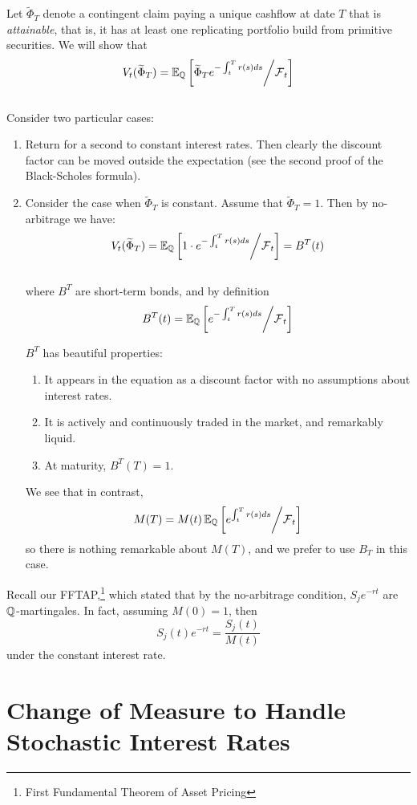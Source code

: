 \documentclass[11pt]{article}
\begin{document}
Let $\widetilde{\Phi}_T$ denote a contingent claim paying a unique cashflow at date $T$ that is {\em attainable}, that is, it has at least one replicating portfolio build from primitive securities. We will show that 
$$ V_t(\widetilde{\Phi}_T) = \operatorname{\mathbb E}_{\operatorname{\mathbb Q}} \left[ \widetilde{\Phi}_T e^{-\int_t^T r(s) ds} \middle/ \operatorname{\mathcal F}_t \right]$$\\

Consider two particular cases:
\begin{enumerate}
\item Return for a second to constant interest rates. Then clearly the discount factor can be moved outside the expectation (see the second proof of the Black-Scholes formula).
\item Consider the case when $\widetilde{\Phi}_T$ is constant. Assume that $\widetilde{\Phi}_T = 1$. Then by no-arbitrage we have:
$$ V_t(\widetilde{\Phi}_T) = \operatorname{\mathbb E}_{\operatorname{\mathbb Q}} \left[ 1 \cdot e^{-\int_t^T r(s) ds} \middle/ \operatorname{\mathcal F}_t \right] = B^T(t)$$\\
where $B^T$ are short-term bonds, and by definition
$$B^T(t) = \operatorname{\mathbb E}_{\operatorname{\mathbb Q}} \left[ e^{-\int_t^T r(s) ds} \middle/ \operatorname{\mathcal F}_t \right]$$

$B^T$ has beautiful properties: 
\begin{enumerate}
\item It appears in the equation as a discount factor with no assumptions about interest rates. 
\item It is actively and continuously traded in the market, and remarkably liquid.
\item At maturity, $B^T(T) = 1$.
\end{enumerate}
We see that in contrast,
$$M(T) = M(t)\operatorname{\mathbb E}_{\operatorname{\mathbb Q}} \left[ e^{\int_t^T r(s) ds} \middle/ \operatorname{\mathcal F}_t \right]$$
so there is nothing remarkable about $M(T)$, and we prefer to use $B_T$ in this case. \\
\end{enumerate}

Recall our FFTAP,\footnote{First Fundamental Theorem of Asset Pricing} which stated that by the no-arbitrage condition, $S_je^{-rt}$ are $\operatorname{\mathbb Q}$-martingales. In fact, assuming $M(0) = 1$, then
$$ S_j(t)e^{-rt} = \frac{S_j(t)}{M(t)}$$
under the constant interest rate.

\section{Change of Measure to Handle Stochastic Interest Rates}
\end{document}
